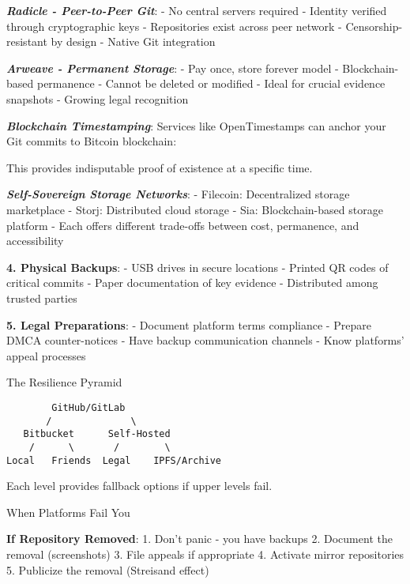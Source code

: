 \textbf{\emph{Radicle - Peer-to-Peer Git}}: - No central servers
required - Identity verified through cryptographic keys - Repositories
exist across peer network - Censorship-resistant by design - Native Git
integration

\textbf{\emph{Arweave - Permanent Storage}}: - Pay once, store forever
model - Blockchain-based permanence - Cannot be deleted or modified -
Ideal for crucial evidence snapshots - Growing legal recognition

\textbf{\emph{Blockchain Timestamping}}: Services like OpenTimestamps
can anchor your Git commits to Bitcoin blockchain:

\begin{Shaded}
\begin{Highlighting}[]

\end{Highlighting}
\end{Shaded}

This provides indisputable proof of existence at a specific time.

\textbf{\emph{Self-Sovereign Storage Networks}}: - Filecoin:
Decentralized storage marketplace - Storj: Distributed cloud storage -
Sia: Blockchain-based storage platform - Each offers different
trade-offs between cost, permanence, and accessibility

\textbf{4. Physical Backups}: - USB drives in secure locations - Printed
QR codes of critical commits - Paper documentation of key evidence -
Distributed among trusted parties

\textbf{5. Legal Preparations}: - Document platform terms compliance -
Prepare DMCA counter-notices - Have backup communication channels - Know
platforms' appeal processes

The Resilience Pyramid

\begin{verbatim}
        GitHub/GitLab
       /              \
   Bitbucket      Self-Hosted
    /      \       /        \
Local   Friends  Legal    IPFS/Archive
\end{verbatim}

Each level provides fallback options if upper levels fail.

When Platforms Fail You

\textbf{If Repository Removed}: 1. Don't panic - you have backups 2.
Document the removal (screenshots) 3. File appeals if appropriate 4.
Activate mirror repositories 5. Publicize the removal (Streisand effect)

